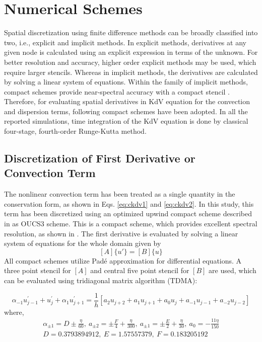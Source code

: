 \documentclass{svjour3}                    %
\begin{document}
\section{Numerical Schemes}
\label{sec:num_sch}
Spatial discretization using finite difference methods can be broadly classified into two, i.e., explicit and implicit methods. In explicit methods, derivatives at any given node is calculated using an explicit expression in terms of the unknown. For better resolution and accuracy, higher order explicit methods may be used, which require larger stencils. Whereas in implicit methods, the derivatives are calculated by solving a linear system of equations. Within the family of implicit methods, compact schemes provide near-spectral accuracy with a compact stencil \cite{Sengupta2013a}. Therefore, for evaluating spatial derivatives in KdV equation for the convection and dispersion terms, following compact schemes have been adopted. In all the reported simulations, time integration of the KdV equation is done by classical four-stage, fourth-order Runge-Kutta method.

\subsection{Discretization of First Derivative or Convection Term}
\label{subsec:OUCS3}
The nonlinear convection term has been treated as a single quantity in the conservation form, as shown in Eqs. \eqref{eq:ckdv1} and \eqref{eq:ckdv2}. 
In this study, this term has been discretized using an optimized upwind compact scheme described in \cite{Sengupta2013a} as OUCS3 scheme. This is a 
compact scheme, which provides excellent spectral resolution, as shown in \cite{Sengupta2006b}. The first derivative is evaluated by solving a linear system of equations for the whole domain given by
$$ [A]\{u'\} = [B]\{u\} $$
All compact schemes utilize Pad\'e approximation for differential equations. A three point stencil for $[A]$ and central five point stencil for $[B]$ are used, which can be evaluated using tridiagonal matrix algorithm (TDMA):

\begin{equation}
\label{eq:oucs3}
\alpha_{-1}u_{j-1}^{\prime}+u_{j}^{\prime}+\alpha_{1}u_{j+1}^{\prime}=\frac{1}{h}[a_{2}u_{j+2}+a_{1}u_{j+1}+a_{0}u_{j}+a_{-1}u_{j-1}+a_{-2}u_{j-2}]
\end{equation}
where,
\begin{align*}
\alpha_{\pm1}=D\pm\frac{\eta}{60},\
a_{\pm2}=\pm\frac{F}{4}+\frac{\eta}{300},\
a_{\pm1}=\pm\frac{E}{2}+\frac{\eta}{30},\ a_{0}=-\frac{11\eta}{150}\\
D=0.3793894912,\
E=1.57557379,\
F=0.183205192
\end{align*}
\end{document}

